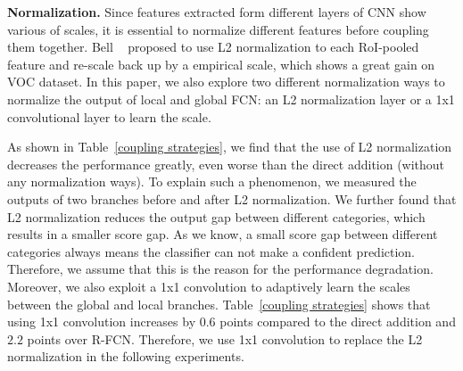 \documentclass[10pt,twocolumn,letterpaper]{article}
\begin{document}
\textbf{Normalization.} Since features extracted form different layers of CNN show various of scales, it is essential to normalize different features before coupling them together. Bell \etal~\cite{bell16ion} proposed to use L2 normalization to each RoI-pooled feature and re-scale back up by a empirical scale, which shows a great gain on VOC dataset. In this paper, we also explore two different normalization ways to normalize the output of local and global FCN: an L2 normalization layer or a 1x1 convolutional layer to learn the scale.

As shown in Table~\ref{coupling strategies}, we find that the use of L2 normalization decreases the performance greatly, even worse than the direct addition (without any normalization ways). To explain such a phenomenon, we measured the outputs of two branches before and after L2 normalization. We further found that L2 normalization reduces the output gap between different categories, which results in a smaller score gap. As we know, a small score gap between different categories always means the classifier can not make a confident prediction. Therefore, we assume that this is the reason for the performance degradation. Moreover, we also exploit a 1x1 convolution to adaptively learn the scales between the global and local branches. Table~\ref{coupling strategies} shows that using 1x1 convolution increases by $0.6$ points compared to the direct addition and $2.2$ points over R-FCN. Therefore, we use 1x1 convolution to replace the L2 normalization in the following experiments.

\begin{table}[htbp]
\begin{center}
\end{center}
\caption{\textbf{Effects of different normalization operation and coupling methods.} Metric: detection mAP($\%$) on VOC07 test. eltwise: combine the output from global and local FCN directly. L2+eltwise: use L2 normalization to normalize the output. 1x1 conv+eltwise: use 1x1 convolution to learn the scale.}
\label{coupling strategies}
\end{table}
\end{document}
